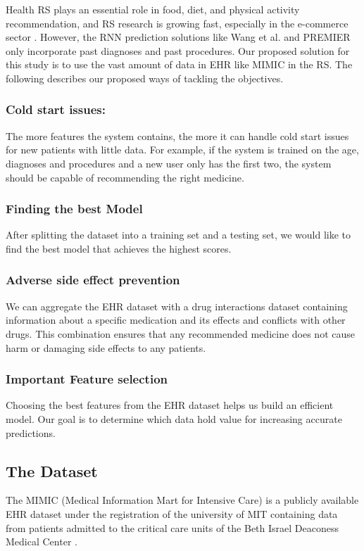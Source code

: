 Health RS plays an essential role in food, diet, and physical activity
recommendation, and RS research is growing fast, especially in the e-commerce
sector \cite{Tran2021b}. However, the RNN prediction solutions
like Wang et al. \cite{Wang} and PREMIER \cite{Bhoi2021} only incorporate past diagnoses and past
procedures. Our proposed solution for this study is to use the vast amount of
data in EHR like MIMIC in the RS.  The following describes our proposed ways of
tackling the objectives.


\subsubsection{
Cold start issues:
}

The more features the system contains, the more it can handle cold start issues
for new patients with little data. For example, if the system is trained on the
age, diagnoses and procedures and a new user only has the first two, the system
should be capable of recommending the right medicine. 

\subsubsection{
Finding the best Model
}
After splitting the dataset into a training set and a testing set, we would
like to find the best model that achieves the highest scores.

\subsubsection{
Adverse side effect prevention
}
We can aggregate the EHR dataset with a drug interactions dataset containing
information about a specific medication and its effects and conflicts with
other drugs. This combination ensures that any recommended medicine does not
cause harm or damaging side effects to any patients. 

\subsubsection{
Important Feature selection
}
Choosing the best features from the EHR dataset helps us build an efficient
model. Our goal is to determine which data hold value for increasing accurate
predictions.


\subsection{
The Dataset 
}
The MIMIC (Medical Information Mart for Intensive Care) is a publicly
available EHR dataset under the registration of the university of MIT
containing data from patients admitted to the critical care units of the Beth
Israel Deaconess Medical Center \cite{Johnson2016}.

